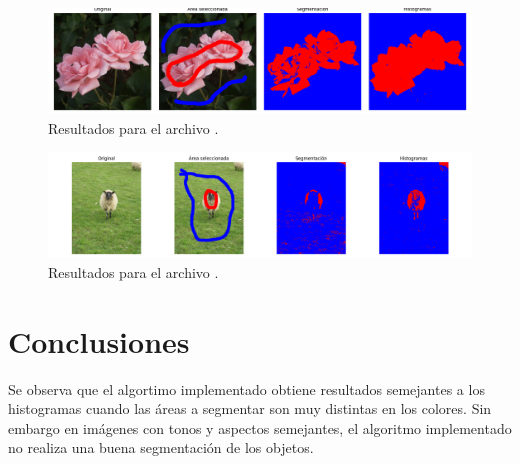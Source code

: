\begin{figure}[H]
    \centering
    \includegraphics[width=1\linewidth]{Graphics/rose/result.png}
    \caption{Resultados para el archivo .}
\end{figure}

\begin{figure}[H]
    \centering
    \includegraphics[width=1\linewidth]{Graphics/sheep/result.png}
    \caption{Resultados para el archivo .}
\end{figure}

\section*{Conclusiones}

Se observa que el algortimo implementado obtiene resultados semejantes a los histogramas cuando las áreas a segmentar son muy distintas en los colores. Sin embargo en imágenes con tonos y aspectos semejantes, el algoritmo implementado no realiza una buena segmentación de los objetos.